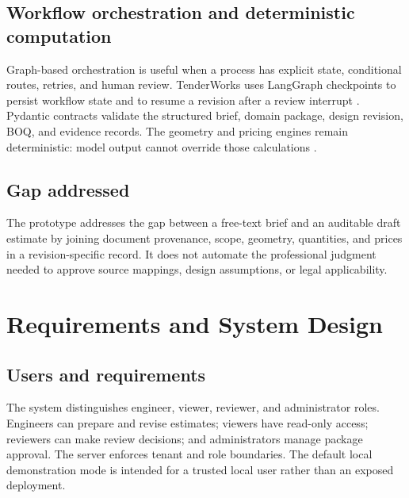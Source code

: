 \subsection{Workflow orchestration and deterministic computation}
Graph-based orchestration is useful when a process has explicit state, conditional routes, retries, and human review. TenderWorks uses LangGraph checkpoints to persist workflow state and to resume a revision after a review interrupt \cite{langgraphDocs}. Pydantic contracts validate the structured brief, domain package, design revision, BOQ, and evidence records. The geometry and pricing engines remain deterministic: model output cannot override those calculations \cite{tenderworks2026}.

\subsection{Gap addressed}
The prototype addresses the gap between a free-text brief and an auditable draft estimate by joining document provenance, scope, geometry, quantities, and prices in a revision-specific record. It does not automate the professional judgment needed to approve source mappings, design assumptions, or legal applicability.

\section{Requirements and System Design}
\subsection{Users and requirements}
The system distinguishes engineer, viewer, reviewer, and administrator roles. Engineers can prepare and revise estimates; viewers have read-only access; reviewers can make review decisions; and administrators manage package approval. The server enforces tenant and role boundaries. The default local demonstration mode is intended for a trusted local user rather than an exposed deployment.

